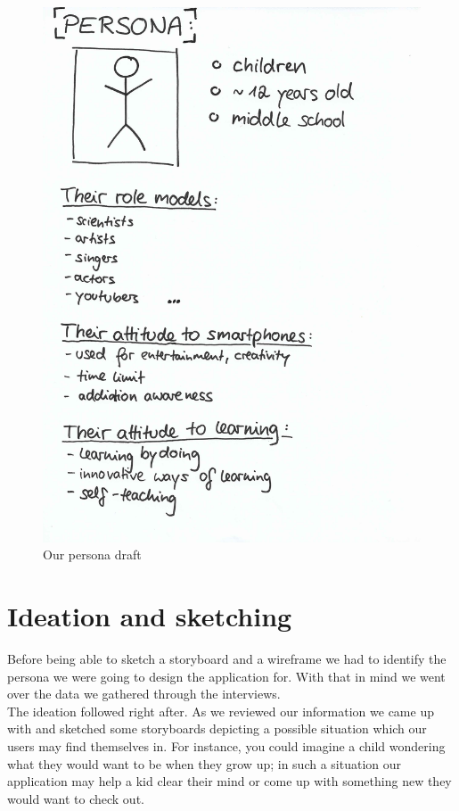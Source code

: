 \documentclass[12pt]{scrartcl}
\begin{document}
	\begin{figure}[H]
        		\centering
       		\includegraphics[width=\textwidth]{../images/persona.jpg}
       		\caption{Our persona draft}
        		\label{persona1}
	\end{figure}
	

\section{Ideation and sketching}

	Before being able to sketch a storyboard and a wireframe we had to identify the persona we 
	were going to design the application for. With that in mind we went over the data we gathered
	through the interviews.\\
	
	The ideation followed right after. As we reviewed our information we came up with and sketched 
	some storyboards depicting a possible situation which our users may find themselves in. 
	For instance, you could imagine a child wondering what they would want to be when they grow
	up; in such a situation our application may help a kid clear their mind or come up with something
	new they would want to check out.\\
	
\end{document}
